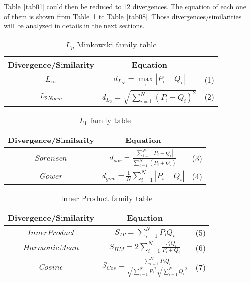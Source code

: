\documentclass[conference]{IEEEtran}
\begin{document}
Table~\ref{tab01} could then be reduced to 12 divergences. The equation of each one of them is shown from Table~\ref{tab02} to Table~\ref{tab08}. Those divergences/similarities will be analyzed in details in the next sections.

\begin{table}[!h]
	\centering
	\caption{$L_p$ Minkowski family table}
	\label{tab02}
	\begin{tabular}{ccc}
		Divergence/Similarity   & Equation   &    \\ \hline
		$L_{\infty}$           &    ${d_{{L_\infty }}} = \mathop {\max }\limits_i \left| {{P_i} - {Q_i}} \right|$        &   (1) \\
		$L_{2Norm}$            &    ${d_{{L_2}}} = \sqrt {\sum\limits_{i = 1}^N {{{\left( {{P_i} - {Q_i}} \right)}^2}} } $        &   (2) \\
		\hline
	\end{tabular}
\end{table}

\begin{table}[!h]
	\centering
	\caption{$L_1$ family table}
	\label{tab03}
	\begin{tabular}{ccc}
		Divergence/Similarity   & Equation   &    \\ \hline
		$Sorensen$           &    ${d_{sor}} = \frac{{\sum\limits_{i = 1}^N {\left| {{P_i} - {Q_i}} \right|} }}{{\sum\limits_{i = 1}^N {\left( {{P_i} + {Q_i}} \right)} }}$        &   (3) \\
		$Gower$            &    ${d_{gow}} = \frac{1}{N}\sum\limits_{i = 1}^N {\left| {{P_i} - {Q_i}} \right|} $        &   (4) \\
		\hline
	\end{tabular}
\end{table}

\begin{table}[!h]
	\centering
	\caption{Inner Product family table}
	\label{tab04}
	\begin{tabular}{ccc}
		Divergence/Similarity   & Equation   &    \\ \hline
		$Inner Product$           &    ${S_{IP}} = \sum\limits_{i = 1}^N {{P_i}{Q_i}}$        &   (5) \\
		$Harmonic Mean$            &    ${S_{HM}} = 2\sum\limits_{i = 1}^N {\frac{{{P_i}{Q_i}}}{{{P_i} + {Q_i}}}}$       &   (6) \\
		$Cosine$            &   ${S_{Cos}} = \frac{{\sum\limits_{i = 1}^N {{P_i}{Q_i}} }}{{\sqrt {\sum\limits_{i = 1}^N {{P_i}^2} } \sqrt {\sum\limits_{i = 1}^N {{Q_i}^2} } }}$	 		    &   (7) \\
		\hline
	\end{tabular}
\end{table}
\end{document}
